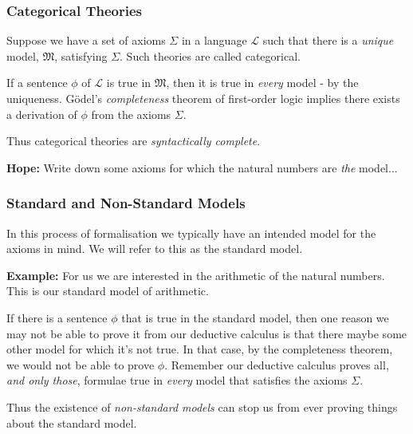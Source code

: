 \documentclass{beamer}
\begin{document}
\begin{frame}
	\frametitle{Categorical Theories}
	
	Suppose we have a set of axioms $\Sigma$ in a language $\mathcal{L}$ such that there is a \textit{unique} model, $\mathfrak{M}$, satisfying $\Sigma$. Such theories are called categorical.
	
	\vspace{0.5cm} 
	
	If a sentence $\phi$ of $\mathcal{L}$ is true in $\mathfrak{M}$, then it is true in \textit{every} model - by the uniqueness. G\"{o}del's \textit{completeness} theorem of first-order logic implies there exists a derivation of $\phi$ from the axioms $\Sigma$. 
	
	\vspace{0.5cm} 
	
	Thus categorical theories are \textit{syntactically complete}.
	
	\vspace{0.5cm}

	{\bf Hope:} Write down some axioms for which the natural numbers are \emph{the} model...
\end{frame}

\begin{frame}
	\frametitle{Standard and Non-Standard Models}
	
	In this process of formalisation we typically have an intended model for the axioms in mind. We will refer to this as the standard model. 
	
	\vspace{0.5cm}
	
	{\bf Example:} For us we are interested in the arithmetic of the natural numbers. This is our standard model of arithmetic. 
	
	\vspace{0.5cm}
	
	If there is a sentence $\phi$ that is true in the standard model, then one reason we may not be able to prove it from our deductive calculus is that there maybe some other model for which it's not true. In that case, by the completeness theorem, we would not be able to prove $\phi$. Remember our deductive calculus proves all, \textit{and only those}, formulae true in \emph{every} model that satisfies the axioms $\Sigma$. 
	
	\vspace{0.5cm}
	
	Thus the existence of \textit{non-standard models} can stop us from ever proving things about the standard model.
\end{frame}
\end{document}
